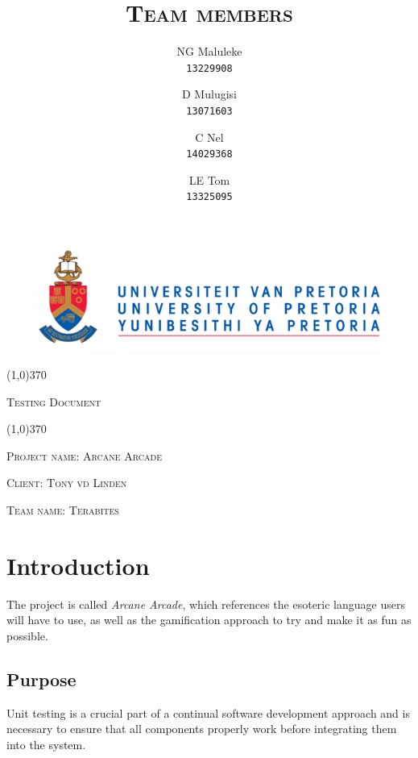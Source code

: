 \documentclass[english]{article}
\title{\scshape\Large Team members}
\author{
	NG Maluleke\\
	\texttt{13229908}
	\and
	D Mulugisi\\
	\texttt{13071603}
	\and
	C Nel\\
	\texttt{14029368}
	\and
	LE Tom\\
	\texttt{13325095}
}
\begin{document}
	
	\begin{figure}
		\includegraphics[width=\linewidth]{up_logo.png}
	\end{figure}
	
	\begin{center}
	 \line(1,0){370}
	\\[0.2cm]
    {\scshape\Large Testing Document \par}
	\vspace{0.1cm}
	\line(1,0){370}
	\\[0.8cm]
	
	{\scshape\large Project name: Arcane Arcade\par}	
	\vspace{1cm}
	{\scshape\large Client: Tony vd Linden\par}
	\vspace{1cm}
	{\scshape\large Team name: Terabites\par}
	\vspace{1cm}
	{\let\newpage\relax\maketitle}
	\end{center}
	
	
	\newpage
	\tableofcontents

	\newpage
	
	\section{Introduction}
		 The project is called \textit{Arcane Arcade}, which references the esoteric language users will have to use, as well as the gamification approach to try and make it as fun as possible.

	
		
		\subsection{Purpose}
			Unit testing is a crucial part of a continual software development approach and is necessary to ensure that all components properly work before integrating them into the system.
\end{document}
